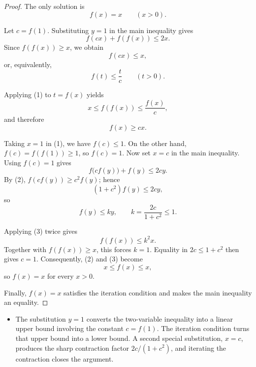 
\begin{dlsummary}[title={\bfseries Solution 37. The Crossed Contraction Lock},breakable]

\begin{proof}
The only solution is
\[
\boxed{f(x)=x\qquad(x>0).}
\]

Let $c=f(1)$. Substituting $y=1$ in the main inequality gives
\[
f(cx)+f(f(x))\le2x.
\]
Since $f(f(x))\ge x$, we obtain
\[
f(cx)\le x,
\]
or, equivalently,
\[
f(t)\le\frac tc\qquad(t>0). \tag{1}
\]

Applying (1) to $t=f(x)$ yields
\[
x\le f(f(x))\le\frac{f(x)}c,
\]
and therefore
\[
f(x)\ge cx. \tag{2}
\]

Taking $x=1$ in (1), we have $f(c)\le1$. On the other hand,
$f(c)=f(f(1))\ge1$, so $f(c)=1$. Now set $x=c$ in the main
inequality. Using $f(c)=1$ gives
\[
f\bigl(cf(y)\bigr)+f(y)\le2cy.
\]
By (2), $f(cf(y))\ge c^2f(y)$; hence
\[
(1+c^2)f(y)\le2cy,
\]
so
\[
f(y)\le ky,
\qquad k=\frac{2c}{1+c^2}\le1. \tag{3}
\]

Applying (3) twice gives
\[
f(f(x))\le k^2x.
\]
Together with $f(f(x))\ge x$, this forces $k=1$. Equality in
$2c\le1+c^2$ then gives $c=1$. Consequently, (2) and (3) become
\[
x\le f(x)\le x,
\]
so $f(x)=x$ for every $x>0$.

Finally, $f(x)=x$ satisfies the iteration condition and makes the
main inequality an equality.
\end{proof}
\end{dlsummary}

\begin{takeaways}
\begin{itemize}
\item The substitution $y=1$ converts the two-variable inequality into a
linear upper bound involving the constant $c=f(1)$. The iteration
condition turns that upper bound into a lower bound. A second special
substitution, $x=c$, produces the sharp contraction factor
$2c/(1+c^2)$, and iterating the contraction closes the argument.
\end{itemize}
\end{takeaways}